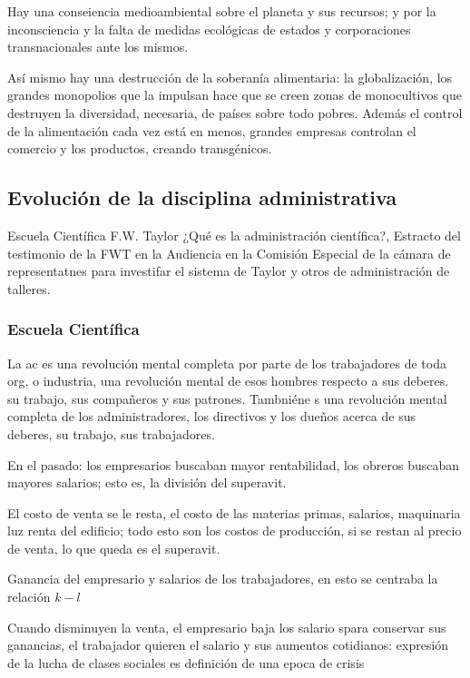 Hay una conseiencia medioambiental sobre el planeta y sus recursos; y por la inconsciencia y la falta de medidas ecológicas de estados y corporaciones transnacionales ante los mismos.

Así mismo hay una destrucción de la soberanía alimentaria: la globalización, los grandes monopolios que la impulsan hace que se creen zonas de monocultivos que destruyen la diversidad, necesaria, de países sobre todo pobres. Además el control de la alimentación cada vez está en menos, grandes empresas controlan el comercio y los productos, creando transgénicos.
\subsection{Evolución de la disciplina administrativa}
Escuela Científica F.W. Taylor ¿Qué es la administración científica?, Estracto del testimonio de la FWT en la Audiencia en la Comisión Especial de la cámara de representatnes para investifar el sistema de Taylor y otros de administración de talleres.

\subsubsection{Escuela Científica}
La ac es una revolución mental completa por parte de los trabajadores de toda org, o industria, una revolución mental de esos hombres respecto a sus deberes. su trabajo, sus compañeros y sus patrones. Tambniéne s una revolución mental completa de los administradores, los directivos y los dueños acerca de sus deberes, su trabajo, sus trabajadores.

En el pasado: los empresarios buscaban mayor rentabilidad, los obreros buscaban mayores salarios; esto es, la división del superavit.

El costo de venta se le resta, el costo de las materias primas, salarios, maquinaria luz renta del edificio; todo esto son los costos de producción, si se restan al precio de venta, lo que queda es el superavit. 
\begin{definition}[Superavit]
    Ganancia del empresario y salarios de los trabajadores, en esto se centraba la relación $k-l$
\end{definition}
Cuando disminuyen la venta, el empresario baja los salario spara conservar sus ganancias, el trabajador quieren el salario y sus aumentos cotidianos: expresión de la lucha de clases sociales es definición de una epoca de crisis

